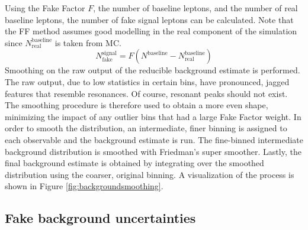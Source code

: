 Using the Fake Factor $F$, the number of baseline leptons, and the number of real baseline leptons, the number of fake signal leptons can be calculated. Note that the FF method assumes good modelling in the real component of the simulation since $N^{\text{baseline}}_{\text{real}}$ is taken from MC.
$$N_{\text{fake}}^{\text{signal}} = F(N^{\text{baseline}}-N^{\text{baseline}}_{\text{real}})$$
Smoothing on the raw output of the reducible background estimate is performed. The raw output, due to low statistics in certain bins, have pronounced, jagged features that resemble resonances. Of course, resonant peaks should not exist. The smoothing procedure is therefore used to obtain a more even shape, minimizing the impact of any outlier bins that had a large Fake Factor weight. In order to smooth the distribution, an intermediate, finer binning is assigned to each observable and the background estimate is run. The fine-binned intermediate background distribution is smoothed with Friedman's super smoother. Lastly, the final background estimate is obtained by integrating over the smoothed distribution using the coarser, original binning. A visualization of the process is shown in Figure \ref{fig:backgroundsmoothing}.


\subsection{Fake background uncertainties}
\label{ssec:fakeuncertainty}

